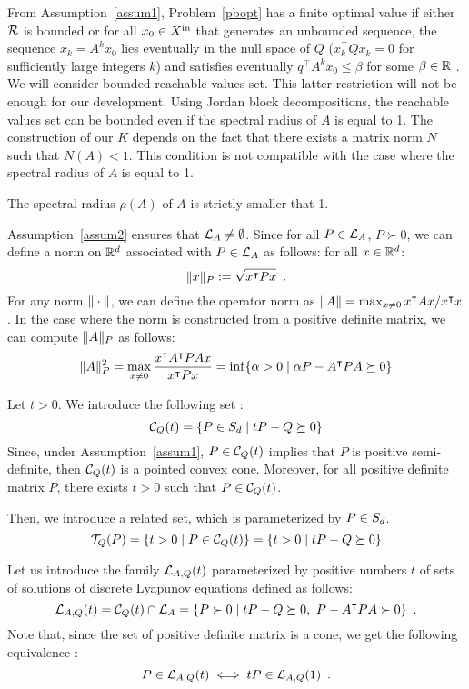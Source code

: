 \documentclass[10pt]{article}
\begin{document}
From Assumption~\ref{assum1}, Problem~\eqref{pbopt} has a finite optimal value if either $\mathcal{R}$ is bounded or for all 
$x_0\in X^\mathrm{in}$ that generates an unbounded sequence, the sequence $x_k=A^k x_0$ lies eventually in the null space of $Q$ ($x_k^\intercal Q x_k=0$ for sufficiently large integers $k$) and satisfies eventually $q^\intercal A^k x_0\leq \beta$ for some $\beta\in\mathbb R$ .  We will consider bounded reachable values set. This latter restriction will not be enough for our development. Using Jordan block decompositions, the reachable values set can be bounded even if the spectral radius of $A$ is equal to 1. The construction of our $K$ depends on the fact that there exists a matrix norm $N$ such that $N(A)<1$. This condition is not compatible with the case where the spectral radius of $A$ is equal to 1.

\begin{assumption}
\label{assum2}
The spectral radius $\rho(A)$ of $A$ is strictly smaller that 1.
\end{assumption}

Assumption~\ref{assum2} ensures that $\mathcal{L}_{A}\neq \emptyset$. Since for all $P\in\mathcal{L}_{A}$, $P\succ 0$, we can define a norm on $\mathbb R^d$ associated with $P\in\mathcal{L}_{A}$ as follows: for all $x\in\mathbb R^d$:
\[\| x\|_P:=\sqrt{x^\intercal P x}\enspace. \]
For any norm $\| \cdot\|$, we can define the operator norm as $\| A\|=\max_{x\neq 0} x^\intercal A x/ x^\intercal x$. In the case where the norm is constructed from a positive definite matrix, we can compute $\| A\|_P$ as follows:
\begin{equation}
\label{normdef}
    \| A\|_P^2=\max_{x\neq 0} \dfrac{x^\intercal A^\intercal P A x}{x^\intercal P x}=\inf\{\alpha>0\mid \alpha P-A^\intercal P A\succeq 0\}
\end{equation}

Let $t>0$. We introduce the following set :  
\[
\mathcal{C}_{Q}(t)=\{P\in S_d\mid tP-Q\succeq 0\}
\]
Since, under Assumption~\ref{assum1}, $P\in\mathcal{C}_{Q}(t)$ implies that $P$ is positive semi-definite, then $\mathcal{C}_{Q}(t)$ is a pointed convex cone. Moreover, for all positive definite matrix $P$, there exists $t>0$ such that $P\in \mathcal{C}_{Q}(t)$. 

Then, we introduce a related set, which is parameterized by $P\in S_d$.
\[
\mathcal{T}_{Q}(P)=\{t>0\mid P\in\mathcal{C}_{Q}(t) \}=\{t>0\mid tP-Q\succeq 0\}
\]

Let us introduce the family $\mathcal{L}_{A,Q}(t)$ parameterized by positive numbers $t$ of sets of solutions of discrete Lyapunov equations defined as follows:
\[
\mathcal{L}_{A,Q}(t)=\mathcal{C}_{Q}(t)\cap\mathcal{L}_{A}=\{P\succ 0\mid tP-Q\succeq 0,\ P-A^\intercal P A\succ 0\}\enspace. 
\]
Note that, since the set of positive definite matrix is a cone, we get the following equivalence :
\begin{equation}
\label{simpleequiv}
P\in\mathcal{L}_{A,Q}(t)\iff tP\in\mathcal{L}_{A,Q}(1)\enspace.
\end{equation}
 
\end{document}

